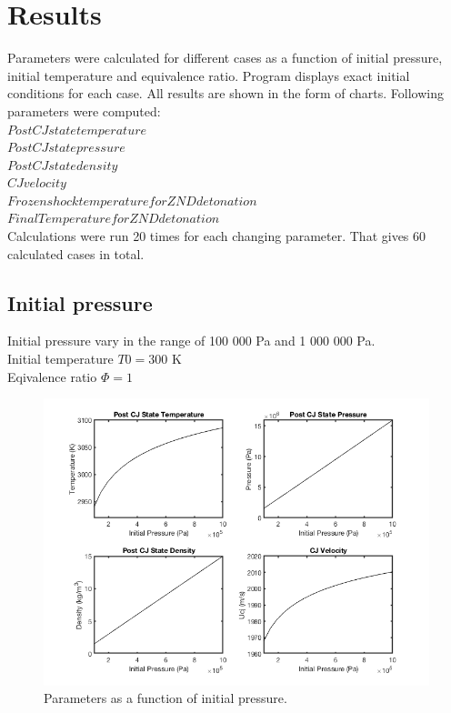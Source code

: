 \documentclass[a4paper]{article}
\newcommand{\sepspace}{\vspace*{1em}}
\begin{document}
\sepspace

\section{Results}

Parameters were calculated for different cases as  a function of initial pressure, initial temperature and equivalence ratio. Program displays exact initial conditions for each case.  All results are shown in the form of charts. Following parameters were computed: \\
\bullet $ Post CJ state temperature$\\
\bullet $ Post CJ state pressure$\\
\bullet $ Post CJ state density$\\
\bullet $ CJ velocity$\\
\bullet $ Frozen shock temperature for ZND detonation$\\
\bullet $ Final Temperature for ZND detonation$\\

\noindent
Calculations were run 20 times for each changing parameter. That gives 60 calculated cases in total.

\pagebreak


\subsection{Initial pressure}
\sepspace

Initial pressure vary in the range of 100 000 Pa and 1 000 000 Pa.\\
Initial temperature $T0 = 300$ K\\
Eqivalence ratio $\Phi = 1$

\begin{figure}[h!]
\centering
\includegraphics[width=1\textwidth]{P.png}
\caption{\label{fig:1}Parameters as a function of initial pressure.}
\end{figure}
\end{document}
